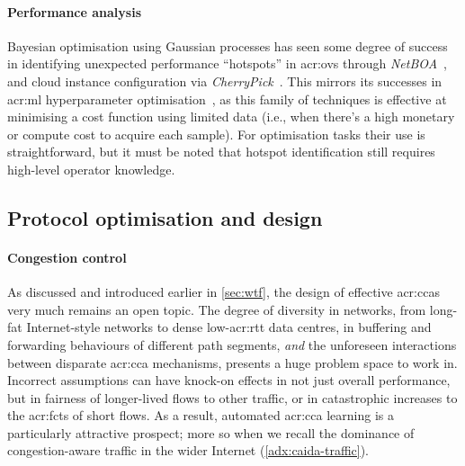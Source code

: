 \paragraph{Performance analysis}
Bayesian optimisation using Gaussian processes has seen some degree of success in identifying unexpected performance ``hotspots'' in \gls{acr:ovs} through \emph{NetBOA}~\parencite{DBLP:conf/sigcomm/ZerwasKHRKB019}, and cloud instance configuration via \emph{CherryPick}~\parencite{DBLP:conf/nsdi/AlipourfardLCVY17}.
This mirrors its successes in \gls{acr:ml} hyperparameter optimisation~\parencite{DBLP:conf/lion/HutterHL11,DBLP:conf/aaai/FeurerSH15}, as this family of techniques is effective at minimising a cost function using limited data (i.e., when there's a high monetary or compute cost to acquire each sample).
For optimisation tasks their use is straightforward, but it must be noted that hotspot identification still requires high-level operator knowledge.

\subsection{Protocol optimisation and design}
\paragraph{Congestion control}
As discussed and introduced earlier in \cref{sec:wtf}, the design of effective \glspl{acr:cca} very much remains an open topic.
The degree of diversity in networks, from long-fat Internet-style networks to dense low-\gls{acr:rtt} data centres, in buffering and forwarding behaviours of different path segments, \emph{and} the unforeseen interactions between disparate \gls{acr:cca} mechanisms, presents a huge problem space to work in.
Incorrect assumptions can have knock-on effects in not just overall performance, but in fairness of longer-lived flows to other traffic, or in catastrophic increases to the \glspl{acr:fct} of short flows.
As a result, automated \gls{acr:cca} learning is a particularly attractive prospect; more so when we recall the dominance of congestion-aware traffic in the wider Internet (\cref{adx:caida-traffic}).

